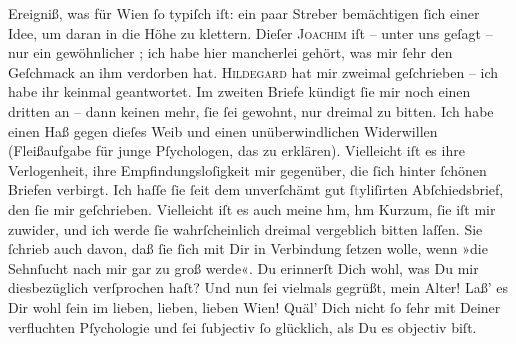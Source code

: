 \begin{ledgroupsized}[t]{13cm}
               Ereigniß, was für Wien ſo \strikeout{\textcolor{gray}{t}\textcolor{gray}{×}} typiſch iſt: ein paar Streber bemächtigen ſich einer Idee, um daran in die
               Höhe zu klettern. Dieſer \textsc{Joachim} iſt – unter uns geſagt – nur ein gewöhnlicher \label{K_L02661-5v}\label{K_L02661-5h}; ich habe
               hier mancherlei gehört, was mir ſehr den Geſchmack an ihm verdorben hat.\pend
           \pstart
           \textsc{Hildegard} hat mir zweimal geſchrieben –  ich habe
               ihr keinmal geantwortet. Im zweiten Briefe kündigt ſie mir noch einen dritten an –
               dann keinen mehr, ſie ſei gewohnt, nur dreimal zu bitten. Ich habe einen Haß gegen
               dieſes Weib und einen
               unüberwindlichen Widerwillen (Fleißaufgabe für junge Pſychologen, das zu erklären).
                  {\pb}Vielleicht iſt es ihre Verlogenheit, ihre
               Empfindungsloſigkeit mir gegenüber, die ſich hinter ſchönen Briefen verbirgt. Ich
               haſſe ſie ſeit dem unverſchämt gut ſ\textcolor{gray}{t}yliſirten Abſchiedsbrief, den
               ſie mir geſchrieben. Vielleicht iſt es auch meine {\dotsfour} hm, hm
                  {\dotsfour} Kurzum, ſie iſt mir zuwider, und ich werde ſie
               wahrſcheinlich dreimal vergeblich bitten laſſen. Sie ſchrieb auch davon, daß ſie ſich
               mit Dir in Verbindung ſetzen wolle, wenn »die Sehnſucht nach  mir gar zu groß werde«. Du erinnerſt Dich wohl, was Du mir diesbezüglich
               verſprochen haſt? {\dotsfour}\pend
           \pstart
           Und nun ſei vielmals gegrüßt, mein Alter! Laß’ es Dir wohl ſein im lieben, lieben,
               lieben Wien! Quäl’ {\pb}Dich nicht ſo ſehr mit Deiner verfluchten
               Pſychologie und ſei ſubjectiv ſo glücklich, als Du es objectiv biſt.\pend

\end{ledgroupsized}
